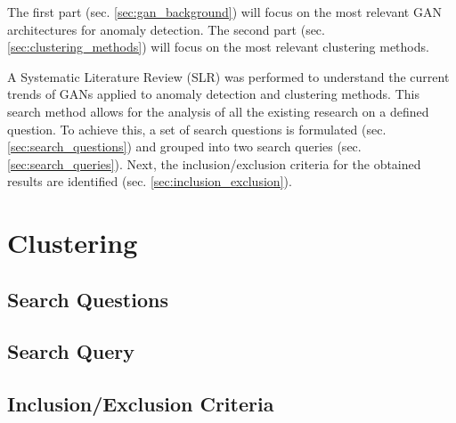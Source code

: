 The first part (sec. \ref{sec:gan_background}) will focus on the most relevant GAN architectures for anomaly detection. The second part (sec. \ref{sec:clustering_methods}) will focus on the most relevant clustering methods.


A Systematic Literature Review (SLR) was performed to understand the current trends of GANs applied to anomaly detection and clustering methods. This search method allows for the analysis of all the existing research on a defined question. To achieve this, a set of search questions is formulated (sec. \ref{sec:search_questions}) and grouped into two search queries (sec. \ref{sec:search_queries}). Next, the inclusion/exclusion criteria for the obtained results are identified (sec. \ref{sec:inclusion_exclusion}).


\section{Clustering}\label{sec:sota_clustering}
\subsection{Search Questions}\label{sec:cluster_search_questions}

\subsection{Search Query}\label{sec:cluster_search_queries}

\subsection{Inclusion/Exclusion Criteria}\label{sec:cluster_inclusion_exclusion}

